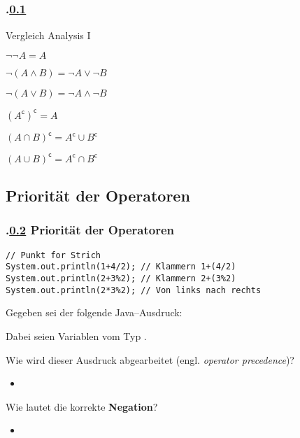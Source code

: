 \subsection{\stitle}\label{S:Morgansche}
\begin{frame}[fragile]%
  \frametitle{\kap.\ref{S:Morgansche} \stitle}%
Vergleich Analysis I
\medskip

\begin{description}
  \item[und bzw. oder]
  \item $\neg \neg A = A$
  \item $\neg (A \wedge B) = \neg A \vee \neg B$
  \item $\neg (A \vee B) = \neg A \wedge \neg B$
\end{description}
\medskip

\begin{description}
  \item[Schnittmenge bzw. Vereinigung]
  \item $(A^{\mathsf{c}})^{\mathsf{c}} = A$
  \item $(A \cap B)^{\mathsf{c}} = A^{\mathsf{c}} \cup B^{\mathsf{c}}$
  \item $(A \cup B)^{\mathsf{c}} = A^{\mathsf{c}} \cap B^{\mathsf{c}}$
\end{description}
\end{frame}

\def\sstitle{Priorität der Operatoren}
\subsection{\sstitle}\label{S:Prioritat}
\begin{frame}[fragile]
  \frametitle{\kap.\ref{S:Prioritat} \sstitle}%

\begin{lstlisting}[style=java, frame=single]
// Punkt for Strich
System.out.println(1+4/2); // Klammern 1+(4/2)
System.out.println(2+3%2); // Klammern 2+(3%2)
System.out.println(2*3%2); // Von links nach rechts
\end{lstlisting}
\vfill

Gegeben sei der folgende Java--Ausdruck:
\begin{center}
\end{center}
Dabei seien  Variablen vom Typ .
\vfill

Wie wird dieser Ausdruck abgearbeitet (engl. \emph{operator precedence})?
\pause
\begin{itemize}
  \item {}
\end{itemize}
Wie lautet die korrekte \textbf{Negation}?
\pause
\begin{itemize}
  \item {}
\end{itemize}

\end{frame}

